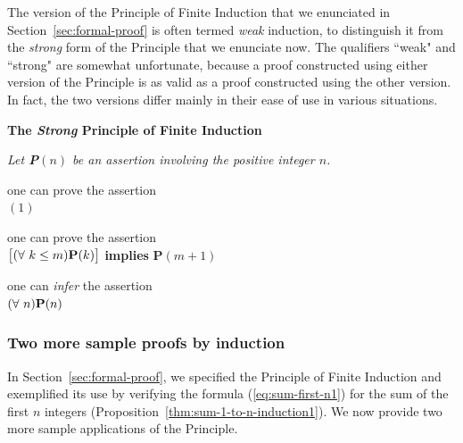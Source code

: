 The version of the Principle of Finite Induction that we enunciated in Section~\ref{sec:formal-proof} is often termed {\em weak} induction, to distinguish it from the {\em strong} form of the Principle that we enunciate now.  The qualifiers ``weak" and ``strong" are somewhat unfortunate, because a proof constructed using either version of the Principle is as valid as a proof constructed using the other version.  In fact, the two versions differ mainly in their ease of use in various situations.

\bigskip

 

\noindent %
\hspace*{.1in}\begin{minipage}{0.95\textwidth}
{\bf The {\em Strong} Principle of Finite Induction}

{\em
Let {\bf P}$(n)$ be an assertion involving the positive integer $n$.

\hspace*{.15in}{\bf if} one can prove the assertion \\
\hspace*{.35in}{\bf P}$(1)$

\hspace*{.15in}{\bf and} one can prove the assertion \\
\hspace*{.35in}$\big[ (\forall \ k \leq m)\mbox{\bf P}(k) \big]$ {\bf implies} {\bf P}$(m+1)$

\hspace*{.15in}{\bf then} one can {\em infer} the assertion \\
\hspace*{.35in}$(\forall \ n) \mbox{\bf P}(n)$
}
\end{minipage} %

\bigskip


\subsubsection{Two more sample proofs by induction}

In Section~\ref{sec:formal-proof}, we specified the Principle of Finite Induction and exemplified its use by verifying the formula (\ref{eq:sum-first-n1}) for the sum of the first $n$ integers
(Proposition~\ref{thm:sum-1-to-n-induction1}).  We now provide two more sample applications of the Principle.

